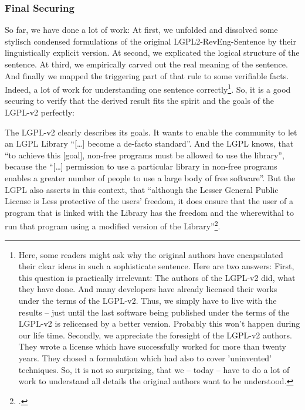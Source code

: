 \subsubsection{Final Securing}

So far, we have done a lot of work: At first, we unfolded and dissolved some
stylisch condensed formulations of the original LGPL2-RevEng-Sentence by their
linguistically explicit version. At second, we explicated the logical structure
of the sentence. At third, we empirically carved out the real meaning of the
sentence. And finally we mapped the triggering part of that rule to some
verifiable facts. Indeed, a lot of work for understanding one sentence
correctly\footnote{Here, some readers might ask why the original authors have
encapsulated their clear ideas in such a sophisticate sentence. Here are two
answers: First, this question is practically irrelevant: The authors of the
LGPL-v2 did, what they have done. And many developers have already licensed
their works under the terms of the LGPL-v2. Thus, we simply have to live with
the results -- just until the last software being published under the terms of
the LGPL-v2 is relicensed by a better version. Probably this won't happen during
our life time. Secondly, we appreciate the foresight of the LGPL-v2 authors.
They wrote a license which have successfully worked for more than twenty years.
They chosed a formulation which had also to cover 'uninvented' techniques. So,
it is not so surprizing, that we -- today -- have to do a lot of work to
understand all details the original authors want to be understood.}. So, it is a
good securing to verify that the derived result fits the spirit and the goals of
the LGPL-v2 perfectly:

The LGPL-v2 clearly describes its goals. It wants to enable the community to let
an LGPL Library \enquote{[\ldots] become a de-facto standard}. And the LGPL
knows, that \enquote{to achieve this [goal], non-free programs must be allowed
to use the library}, because the \enquote{[\ldots] permission to use a particular
library in non-free programs enables a greater number of people to use a large
body of free software}. But the LGPL also asserts in this context, that
\enquote{although the Lesser General Public License is Less protective of the
users' freedom, it does ensure that the user of a program that is linked with
the Library has the freedom and the wherewithal to run that program using a
modified version of the Library}\footcite[cf.][\nopage wp., preamble, emphasis
KR.]{Lgpl21OsiLicense1999a}.

